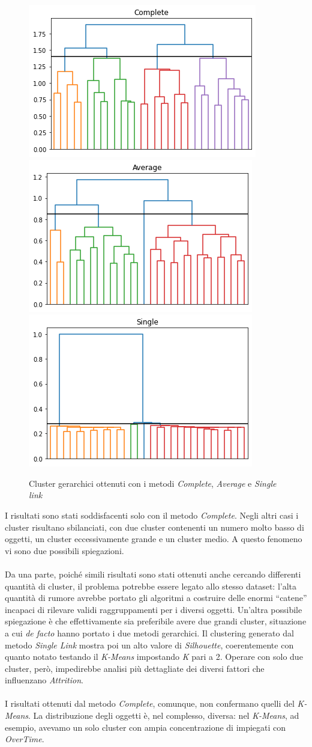 \begin{figure}[H]
\centering
\includegraphics[width=.3\textwidth]{Immagini/GeraComplete.png}\hfill
\includegraphics[width=.3\textwidth]{Immagini/GeraAvg.png}\hfill
\includegraphics[width=.3\textwidth]{Immagini/GeraSingle.png}
\caption{Cluster gerarchici ottenuti con i metodi \textit{Complete}, \textit{Average} e \textit{Single link}}
\label{fig:clusterGerarchico}

\end{figure}
\noindent I risultati sono stati soddisfacenti solo con il metodo \textit{Complete}. Negli altri casi i cluster risultano sbilanciati, con due cluster contenenti un numero molto basso di oggetti, un cluster eccessivamente grande e un cluster medio. A questo fenomeno vi sono due possibili spiegazioni. \\\\Da una parte, poiché simili risultati sono stati ottenuti anche cercando differenti quantità di cluster, il problema potrebbe essere legato allo stesso dataset: l’alta quantità di rumore avrebbe portato gli algoritmi a costruire delle enormi “catene” incapaci di rilevare validi raggruppamenti per i diversi oggetti. Un'altra possibile spiegazione è che effettivamente sia preferibile avere due grandi cluster, situazione a cui \textit{de facto} hanno portato i due metodi gerarchici. Il clustering generato dal metodo \textit{Single Link} mostra poi un alto valore di \textit{Silhouette}, coerentemente con quanto notato testando il \textit{K-Means} impostando \textit{K} pari a 2. Operare con solo due cluster, però, impedirebbe analisi più dettagliate dei diversi fattori che influenzano \textit{Attrition}.
\\\\I risultati ottenuti dal metodo \textit{Complete}, comunque, non confermano quelli del \textit{K-Means}. La distribuzione degli oggetti è, nel complesso, diversa: nel \textit{K-Means}, ad esempio, avevamo un solo cluster con ampia concentrazione di impiegati con \textit{OverTime}.





